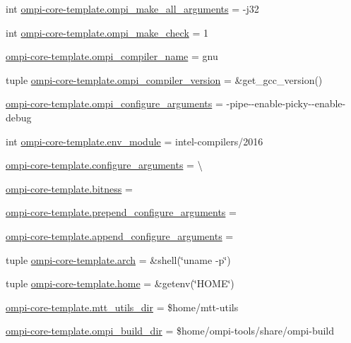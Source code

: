 \begin{DoxyCompactItemize}
\item 
int \hyperlink{namespaceompi-core-template_a8cfb168e266191b0299e13db0e040acf}{ompi-\/core-\/template.\-ompi\-\_\-make\-\_\-all\-\_\-arguments} = -\/j32
\item 
int \hyperlink{namespaceompi-core-template_a22a1627fa5b27a6349a7d4804e9baaca}{ompi-\/core-\/template.\-ompi\-\_\-make\-\_\-check} = 1
\item 
\hyperlink{namespaceompi-core-template_ade0d9e9efc683bbbb68edd34d616526f}{ompi-\/core-\/template.\-ompi\-\_\-compiler\-\_\-name} = gnu
\item 
tuple \hyperlink{namespaceompi-core-template_a995fd0de0a7e064a6959e6ba7e59a525}{ompi-\/core-\/template.\-ompi\-\_\-compiler\-\_\-version} = \&get\-\_\-gcc\-\_\-version()
\item 
\hyperlink{namespaceompi-core-template_a3617cfaebbf09bd156bb6f00d4584019}{ompi-\/core-\/template.\-ompi\-\_\-configure\-\_\-arguments} = -\/pipe-\/-\/enable-\/picky-\/-\/enable-\/debug
\item 
int \hyperlink{namespaceompi-core-template_a3bf425cb265062b8fec8a62d2a1fd8a3}{ompi-\/core-\/template.\-env\-\_\-module} = intel-\/compilers/2016
\item 
\hyperlink{namespaceompi-core-template_aa36e733a811f66e0670e3e5359fa87c0}{ompi-\/core-\/template.\-configure\-\_\-arguments} = \textbackslash{}
\item 
\hyperlink{namespaceompi-core-template_a33886dd20e2ff716e34eaa7ef4ca4af2}{ompi-\/core-\/template.\-bitness} =
\item 
\hyperlink{namespaceompi-core-template_a9f5830661ad9df1c27b678278222d554}{ompi-\/core-\/template.\-prepend\-\_\-configure\-\_\-arguments} =
\item 
\hyperlink{namespaceompi-core-template_ad3863a095d671688912d3297baf0f161}{ompi-\/core-\/template.\-append\-\_\-configure\-\_\-arguments} =
\item 
tuple \hyperlink{namespaceompi-core-template_a710dd59a52ca88aad0a440a9d78a386c}{ompi-\/core-\/template.\-arch} = \&shell(\char`\"{}uname -\/p\char`\"{})
\item 
tuple \hyperlink{namespaceompi-core-template_ae80397dcb3454ac02e396f9faec83f92}{ompi-\/core-\/template.\-home} = \&getenv(\char`\"{}H\-O\-M\-E\char`\"{})
\item 
\hyperlink{namespaceompi-core-template_ae338b0b9d4bd23546207d4ce98454696}{ompi-\/core-\/template.\-mtt\-\_\-utils\-\_\-dir} = \$home/mtt-\/utils
\item 
\hyperlink{namespaceompi-core-template_a16792dcf7471cfb9371e3866e5b29bda}{ompi-\/core-\/template.\-ompi\-\_\-build\-\_\-dir} = \$home/ompi-\/tools/share/ompi-\/build

\end{DoxyCompactItemize}
